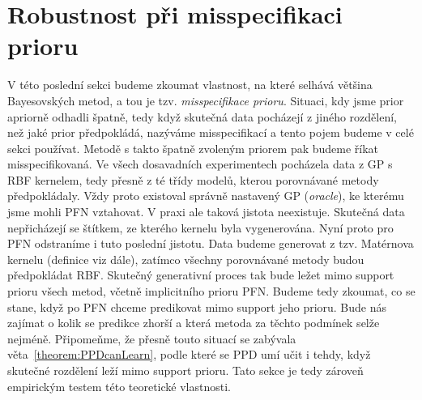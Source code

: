 \section{Robustnost při misspecifikaci prioru}
\label{sec:misspecifikace}

V této poslední sekci budeme zkoumat vlastnost, na které selhává většina Bayesovských metod, a tou je tzv. \emph{misspecifikace prioru}.
Situaci, kdy jsme prior apriorně odhadli špatně, tedy když skutečná data pocházejí z jiného rozdělení, než jaké prior předpokládá, nazýváme misspecifikací a tento pojem budeme v celé sekci používat.
Metodě s takto špatně zvoleným priorem pak budeme říkat misspecifikovaná.
Ve všech dosavadních experimentech pocházela data z GP s RBF kernelem, tedy přesně z té třídy modelů, kterou porovnávané metody předpokládaly.
Vždy proto existoval správně nastavený GP (\emph{oracle}), ke kterému jsme mohli PFN vztahovat.
V praxi ale taková jistota neexistuje.
Skutečná data nepřicházejí se štítkem, ze kterého kernelu byla vygenerována.
Nyní proto pro PFN odstraníme i tuto poslední jistotu.
Data budeme generovat z tzv. Matérnova kernelu (definice viz dále), zatímco všechny porovnávané metody budou předpokládat RBF.
Skutečný generativní proces tak bude ležet mimo support prioru všech metod, včetně implicitního prioru PFN.
Budeme tedy zkoumat, co se stane, když po PFN chceme predikovat mimo support jeho prioru.
Bude nás zajímat o kolik se predikce zhorší a která metoda za těchto podmínek selže nejméně.
Připomeňme, že přesně touto situací se zabývala věta~\ref{theorem:PPDcanLearn}, podle které se PPD umí učit i tehdy, když skutečné rozdělení leží mimo support prioru.
Tato sekce je tedy zároveň empirickým testem této teoretické vlastnosti.
\par

